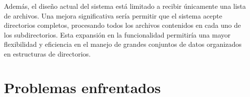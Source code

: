 \documentclass{article}
\begin{document}
Además, el diseño actual del sistema está limitado a recibir únicamente una lista de archivos. Una mejora significativa sería permitir que el sistema acepte directorios completos, procesando todos los archivos contenidos en cada uno de los subdirectorios. Esta expansión en la funcionalidad permitiría una mayor flexibilidad y eficiencia en el manejo de grandes conjuntos de datos organizados en estructuras de directorios.

\section{Problemas enfrentados}
\end{document}
